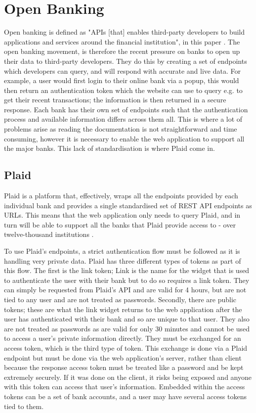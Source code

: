 \section{Open Banking}
\label{sec:open-banking}
Open banking is defined as "APIs [that] enables third-party developers to build applications and services around the financial institution", in this paper \cite{OpenBankingDefinition}. The open banking movement, is therefore the recent pressure on banks to open up their data to third-party developers. They do this by creating a set of endpoints which developers can query, and will respond with accurate and live data. For example, a user would first login to their online bank via a popup, this would then return an authentication token which the website can use to query e.g. to get their recent transactions; the information is then returned in a secure response. Each bank has their own set of endpoints such that the authentication process and available information differs across them all. This is where a lot of problems arise as reading the documentation is not straightforward and time consuming, however it is necessary to enable the web application to support all the major banks. This lack of standardisation is where Plaid \cite{Plaid} come in.

\subsection{Plaid}
\label{sec:plaid}
Plaid is a platform that, effectively, wraps all the endpoints provided by each individual bank and provides a single standardised set of REST API endpoints as URLs. This means that the web application only needs to query Plaid, and in turn will be able to support all the banks that Plaid provide access to - over twelve-thousand institutions \cite{PlaidInstitutions}.

To use Plaid's endpoints, a strict authentication flow must be followed as it is handling very private data. Plaid has three different types of tokens as part of this flow. The first is the link token; Link is the name for the widget that is used to authenticate the user with their bank but to do so requires a link token. They can simply be requested from Plaid's API and are valid for 4 hours, but are not tied to any user and are not treated as passwords. Secondly, there are public tokens; these are what the link widget returns to the web application after the user has authenticated with their bank and so are unique to that user. They also are not treated as passwords as are valid for only 30 minutes and cannot be used to access a user's private information directly. They must be exchanged for an access token, which is the third type of token. This exchange is done via a Plaid endpoint but must be done via the web application's server, rather than client because the response access token must be treated like a password and be kept extremely securely. If it was done on the client, it risks being exposed and anyone with this token can access that user's information. Embedded within the access tokens can be a set of bank accounts, and a user may have several access tokens tied to them.

